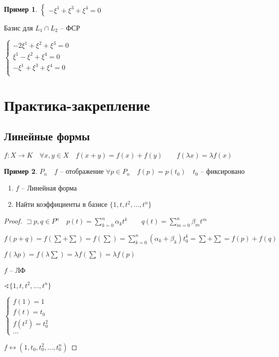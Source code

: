 \documentclass{book}
\theoremstyle{definition}
\newtheorem*{example}{Пример}
\begin{document}
\begin{example}
        $\begin{cases}
            -\xi^1+\xi^3+\xi^4 = 0
        \end{cases}$ 

        Базис для $ L_1\cap L_2$ -- ФСР

        $\begin{cases}
            -2\xi^1+\xi^2+\xi^3 = 0\\
            \xi^1-\xi^2+\xi^4= 0\\
            -\xi^1+\xi^3+\xi^4 = 0\\
        \end{cases}$
    \end{example}

    \section{Практика-закрепление}

    \subsection{Линейные формы}

    $f:X\to K\quad \forall x, y\in X\quad f\left( x+y \right)  = f(x) + f(y)\qquad f\left(\lambda x  \right)  = \lambda f(x)$

    \begin{example}
        $P_n\quad f$ -- отображение  $\forall p\in P_n\quad f(p) = p\left( t_0 \right) \quad t_0$ -- фиксировано

        \begin{enumerate}
            \item $f$ -- Линейная форма
            \item Найти коэффициенты в базисе  $\{1, t, t^2, \ldots, t^n\}$
        \end{enumerate}
    \end{example}
    \begin{proof}
        $\sqsupset p, q\in P^n\quad p(t) = \sum_{k=0}^{n} \alpha_kt^k\qquad q(t) = \sum_{m=0}^{n} \beta_mt^m$

        $f\left( p + q \right)  = f\left( \sum + \sum \right)  = f\left( \sum  \right)  = \sum_{k=0}^{n} \left( \alpha_k+\beta_k \right) t_0^k = \sum  + \sum = f(p) + f(q)$ 

        $f\left( \lambda p \right)  = f\left( \lambda\sum  \right)  = \lambda f\left( \sum \right) =\lambda f(p)$

        $f$ -- ЛФ

        $\sphericalangle \{1, t, t^2, \ldots, t^n\}$

         $\begin{cases}
             f(1) = 1\\
             f(t) = t_0\\
             f(t^2) = t_0^2\\
             \ldots
         \end{cases}$ 

         $f\leftrightarrow(1, t_0, t_0^2, \ldots, t_0^n)$
             
    \end{proof}
\end{document}
